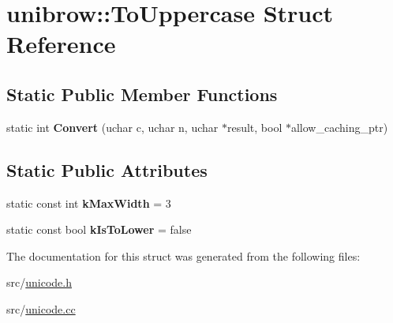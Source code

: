 \hypertarget{structunibrow_1_1_to_uppercase}{}\section{unibrow\+:\+:To\+Uppercase Struct Reference}
\label{structunibrow_1_1_to_uppercase}
\subsection*{Static Public Member Functions}
\begin{DoxyCompactItemize}
\item 
\hypertarget{structunibrow_1_1_to_uppercase_af0d9d46393e190811df7aee125999757}{}static int {\bfseries Convert} (uchar c, uchar n, uchar $\ast$result, bool $\ast$allow\+\_\+caching\+\_\+ptr)\label{structunibrow_1_1_to_uppercase_af0d9d46393e190811df7aee125999757}

\end{DoxyCompactItemize}
\subsection*{Static Public Attributes}
\begin{DoxyCompactItemize}
\item 
\hypertarget{structunibrow_1_1_to_uppercase_aeb0ac39ab96dff4ae331cee78b32a30f}{}static const int {\bfseries k\+Max\+Width} = 3\label{structunibrow_1_1_to_uppercase_aeb0ac39ab96dff4ae331cee78b32a30f}

\item 
\hypertarget{structunibrow_1_1_to_uppercase_a531f28567099ef97da4686bd9938ff54}{}static const bool {\bfseries k\+Is\+To\+Lower} = false\label{structunibrow_1_1_to_uppercase_a531f28567099ef97da4686bd9938ff54}

\end{DoxyCompactItemize}


The documentation for this struct was generated from the following files\+:\begin{DoxyCompactItemize}
\item 
src/\hyperlink{unicode_8h}{unicode.\+h}\item 
src/\hyperlink{unicode_8cc}{unicode.\+cc}\end{DoxyCompactItemize}
